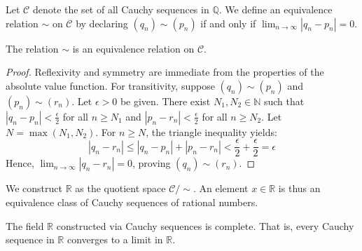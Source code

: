 Let $\mathcal{C}$ denote the set of all Cauchy sequences in $\mathbb{Q}$. We define an equivalence relation $\sim$ on $\mathcal{C}$ by declaring $(q_n) \sim (p_n)$ if and only if $\lim_{n \to \infty} |q_n - p_n| = 0$.

\begin{lemma}
The relation $\sim$ is an equivalence relation on $\mathcal{C}$.
\end{lemma}

\begin{proof}
Reflexivity and symmetry are immediate from the properties of the absolute value function. For transitivity, suppose $(q_n) \sim (p_n)$ and $(p_n) \sim (r_n)$. Let $\epsilon > 0$ be given. There exist $N_1, N_2 \in \mathbb{N}$ such that $|q_n - p_n| < \frac{\epsilon}{2}$ for all $n \ge N_1$ and $|p_n - r_n| < \frac{\epsilon}{2}$ for all $n \ge N_2$. Let $N = \max(N_1, N_2)$. For $n \ge N$, the triangle inequality yields:
\[
|q_n - r_n| \le |q_n - p_n| + |p_n - r_n| < \frac{\epsilon}{2} + \frac{\epsilon}{2} = \epsilon
\]
Hence, $\lim_{n \to \infty} |q_n - r_n| = 0$, proving $(q_n) \sim (r_n)$.
\end{proof}

We construct $\mathbb{R}$ as the quotient space $\mathcal{C} / \sim$. An element $x \in \mathbb{R}$ is thus an equivalence class of Cauchy sequences of rational numbers.

\begin{theorem}
The field $\mathbb{R}$ constructed via Cauchy sequences is complete. That is, every Cauchy sequence in $\mathbb{R}$ converges to a limit in $\mathbb{R}$.
\end{theorem}

